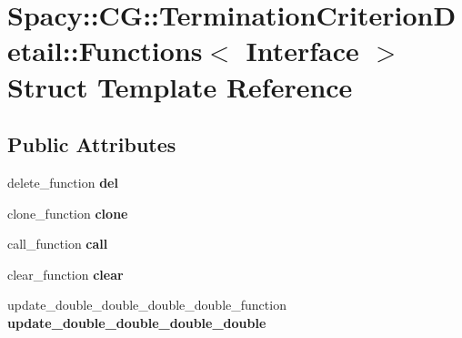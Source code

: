 \hypertarget{structSpacy_1_1CG_1_1TerminationCriterionDetail_1_1Functions}{\section{\-Spacy\-:\-:\-C\-G\-:\-:\-Termination\-Criterion\-Detail\-:\-:\-Functions$<$ \-Interface $>$ \-Struct \-Template \-Reference}
\label{structSpacy_1_1CG_1_1TerminationCriterionDetail_1_1Functions}
}
\subsection*{\-Public \-Attributes}
\begin{DoxyCompactItemize}
\item 
\hypertarget{structSpacy_1_1CG_1_1TerminationCriterionDetail_1_1Functions_a8053c6f4bed436b5070ab5f4f33db589}{delete\-\_\-function {\bfseries del}}\label{structSpacy_1_1CG_1_1TerminationCriterionDetail_1_1Functions_a8053c6f4bed436b5070ab5f4f33db589}

\item 
\hypertarget{structSpacy_1_1CG_1_1TerminationCriterionDetail_1_1Functions_a9d628f3d13476c8b6cefb351b01103dd}{clone\-\_\-function {\bfseries clone}}\label{structSpacy_1_1CG_1_1TerminationCriterionDetail_1_1Functions_a9d628f3d13476c8b6cefb351b01103dd}

\item 
\hypertarget{structSpacy_1_1CG_1_1TerminationCriterionDetail_1_1Functions_adaa41a6e1c9701dffb12b64e9d374622}{call\-\_\-function {\bfseries call}}\label{structSpacy_1_1CG_1_1TerminationCriterionDetail_1_1Functions_adaa41a6e1c9701dffb12b64e9d374622}

\item 
\hypertarget{structSpacy_1_1CG_1_1TerminationCriterionDetail_1_1Functions_a4e896d39e6db22208211d41324b30bba}{clear\-\_\-function {\bfseries clear}}\label{structSpacy_1_1CG_1_1TerminationCriterionDetail_1_1Functions_a4e896d39e6db22208211d41324b30bba}

\item 
\hypertarget{structSpacy_1_1CG_1_1TerminationCriterionDetail_1_1Functions_a7bb68d35041ea7cbe89d500d875b164d}{update\-\_\-double\-\_\-double\-\_\-double\-\_\-double\-\_\-function {\bfseries update\-\_\-double\-\_\-double\-\_\-double\-\_\-double}}\label{structSpacy_1_1CG_1_1TerminationCriterionDetail_1_1Functions_a7bb68d35041ea7cbe89d500d875b164d}


\end{DoxyCompactItemize}
